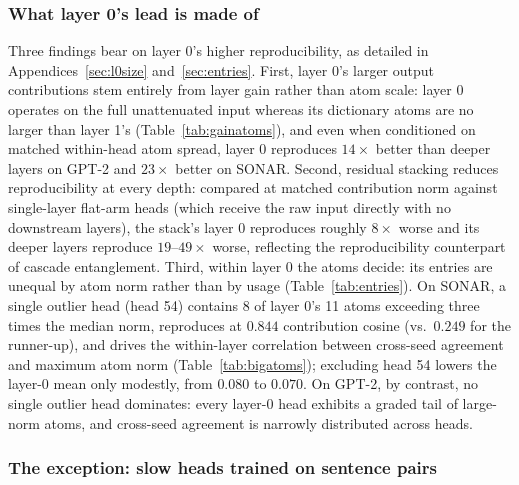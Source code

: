 \subsubsection{What layer 0's lead is made of}

Three findings bear on layer 0's higher reproducibility, as detailed
in Appendices~\ref{sec:l0size} and~\ref{sec:entries}. First, layer 0's
larger output contributions stem entirely from layer gain rather than atom
scale: layer 0 operates on the full unattenuated input whereas its dictionary
atoms are no larger than layer 1's (Table~\ref{tab:gainatoms}), and even
when conditioned on matched within-head atom spread, layer 0 reproduces
$14\times$ better than deeper layers on GPT-2 and $23\times$ better on
SONAR. Second, residual stacking reduces reproducibility at every depth:
compared at matched contribution norm against single-layer flat-arm heads
(which receive the raw input directly with no downstream layers), the
stack's layer 0 reproduces roughly $8\times$ worse and its deeper layers
reproduce $19$--$49\times$ worse, reflecting the reproducibility counterpart
of cascade entanglement. Third, within layer 0 the atoms decide: its
entries are unequal by atom norm rather than by usage
(Table~\ref{tab:entries}). On SONAR, a single outlier head (head 54)
contains 8 of layer 0's 11 atoms exceeding three times the median norm,
reproduces at $0.844$ contribution cosine (vs.\ $0.249$ for the runner-up),
and drives the within-layer correlation between cross-seed agreement and
maximum atom norm (Table~\ref{tab:bigatoms}); excluding head 54 lowers the
layer-0 mean only modestly, from $0.080$ to $0.070$. On GPT-2, by contrast,
no single outlier head dominates: every layer-0 head exhibits a graded tail
of large-norm atoms, and cross-seed agreement is narrowly distributed across
heads.

\subsubsection{The exception: slow heads trained on sentence pairs}
\label{sec:slowheads}

